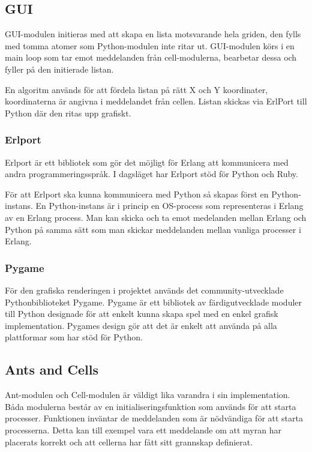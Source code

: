 \documentclass[12pt]{article}
\begin{document}
\subsection{GUI}
GUI-modulen initieras med att skapa en lista motsvarande hela griden,
den fylls med tomma atomer som Python-modulen inte ritar ut.
GUI-modulen körs i en main loop som tar emot meddelanden från cell-modulerna,
bearbetar dessa och fyller på den initierade listan.

En algoritm används för att fördela listan på rätt X och Y koordinater,
koordinaterna är angivna i meddelandet från cellen.
Listan skickas via ErlPort till Python där den ritas upp grafiskt.

\subsubsection{Erlport}
Erlport är ett bibliotek som gör det möjligt för Erlang att kommunicera med andra programmeringsspråk.
I dagsläget har Erlport stöd för Python och Ruby.

För att Erlport ska kunna kommunicera med Python så skapas först en Python-instans.
En Python-instans är i princip en OS-process som representeras i Erlang av en Erlang process.
Man kan skicka och ta emot medelanden mellan Erlang och Python på samma sätt som man skickar meddelanden mellan vanliga processer i Erlang.

\subsubsection{Pygame}
För den grafiska renderingen i projektet används det community-utvecklade Pythonbiblioteket Pygame.
Pygame är ett bibliotek av färdigutvecklade moduler till Python designade för att enkelt kunna skapa spel med en enkel grafisk implementation.
Pygames design gör att det är enkelt att använda på alla plattformar som har stöd för Python.

\subsection{Ants and Cells}
Ant-modulen och Cell-modulen är väldigt lika varandra i sin implementation.
Båda modulerna består av en initialiseringsfunktion som används för att starta processer.
Funktionen inväntar de meddelanden som är nödvändiga för att starta processerna.
Detta kan till exempel vara ett meddelande om att myran har placerats korrekt och att cellerna har fått sitt grannskap definierat.
\end{document}
